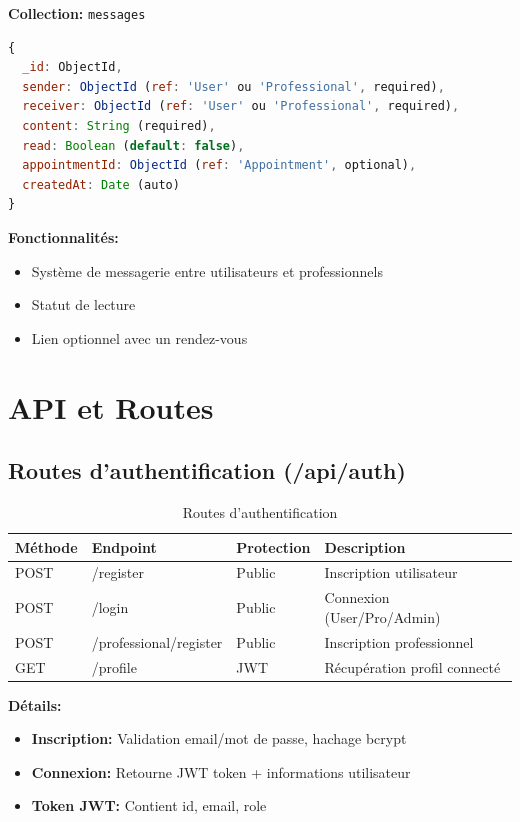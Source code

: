\documentclass[12pt,a4paper]{article}
\begin{document}
\textbf{Collection:} \texttt{messages}

\begin{lstlisting}[language=JavaScript,caption=Modèle Message]
{
  _id: ObjectId,
  sender: ObjectId (ref: 'User' ou 'Professional', required),
  receiver: ObjectId (ref: 'User' ou 'Professional', required),
  content: String (required),
  read: Boolean (default: false),
  appointmentId: ObjectId (ref: 'Appointment', optional),
  createdAt: Date (auto)
}
\end{lstlisting}

\textbf{Fonctionnalités:}
\begin{itemize}
    \item Système de messagerie entre utilisateurs et professionnels
    \item Statut de lecture
    \item Lien optionnel avec un rendez-vous
\end{itemize}

\section{API et Routes}

\subsection{Routes d'authentification (/api/auth)}

\begin{table}[h]
\centering
\begin{tabular}{|l|l|l|p{4cm}|}
\hline
\textbf{Méthode} & \textbf{Endpoint} & \textbf{Protection} & \textbf{Description} \\
\hline
POST & /register & Public & Inscription utilisateur \\
POST & /login & Public & Connexion (User/Pro/Admin) \\
POST & /professional/register & Public & Inscription professionnel \\
GET & /profile & JWT & Récupération profil connecté \\
\hline
\end{tabular}
\caption{Routes d'authentification}
\end{table}

\textbf{Détails:}
\begin{itemize}
    \item \textbf{Inscription:} Validation email/mot de passe, hachage bcrypt
    \item \textbf{Connexion:} Retourne JWT token + informations utilisateur
    \item \textbf{Token JWT:} Contient id, email, role
\end{itemize}
\end{document}
